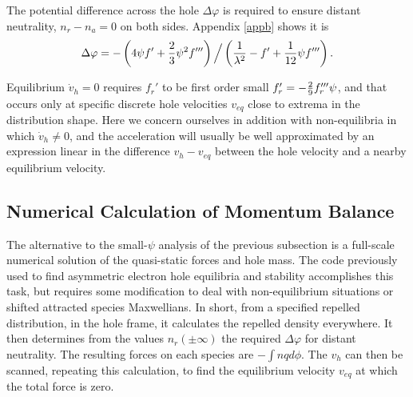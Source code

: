 \documentclass[aip,pop,article-title]{revtex4-2}
\begin{document}
The potential difference across the hole $\Delta\varphi$ is required
to ensure distant neutrality, $n_r-n_a=0$ on both sides. Appendix \ref{appb}
shows it is
\begin{equation}\label{Delphi}
  \Delta\varphi= -\left(4{\psi}f'+{2\over3}\psi^2f'''\right)\Big/\left({1\over \lambda^2}-f'+{1\over12}{\psi}f'''\right).
\end{equation}


Equilibrium $\dot v_h=0$ requires $f_r'$ to be first order small
$f_r'= -{2\over9} f_r'''{\psi}$, and that occurs only at specific
discrete hole velocities $v_{eq}$ close to extrema in the distribution
shape. Here we concern ourselves in addition with non-equilibria in
which $\dot v_h\not=0$, and the acceleration will usually be well
approximated by an expression linear in the difference $v_h- v_{eq}$
between the hole velocity and a nearby equilibrium velocity.

\subsection{Numerical Calculation of Momentum Balance}

The alternative to the small-$\psi$ analysis of the previous
subsection is a full-scale numerical solution of the quasi-static
forces and hole mass. The code previously used to find asymmetric
electron hole equilibria and stability\cite{Hutchinson2021d}
accomplishes this task, but requires some modification to deal with
non-equilibrium situations or shifted attracted species Maxwellians.
In short, from a specified repelled distribution, in the hole frame,
it calculates the repelled density everywhere. It then determines from
the values $n_r(\pm\infty)$ the required $\Delta\varphi$ for distant
neutrality. The resulting forces on each species are $-\int nq
d\phi$. The $v_h$ can then be scanned, repeating this calculation, to
find the equilibrium velocity $v_{eq}$ at which the total force is
zero.
\end{document}
